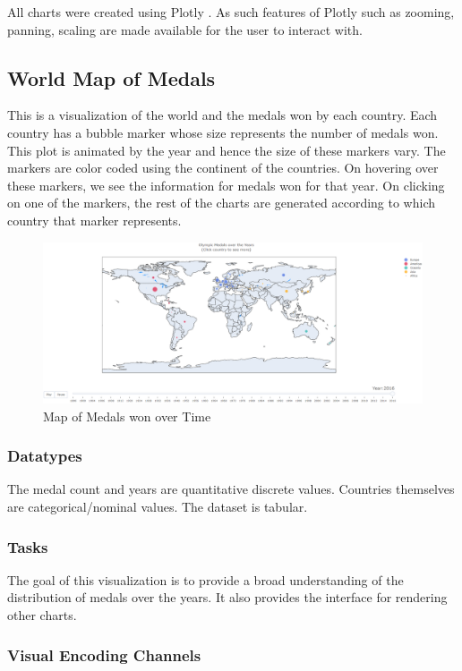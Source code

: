 \documentclass[a4paper, 10pt]{article}
\begin{document}
All charts were created using Plotly \cite{plotly}. As such features of Plotly such as zooming, panning, scaling are made available for the user to interact with.

\subsection{World Map of Medals}

This is a visualization of the world and the medals won by each country. Each country has a bubble marker whose size represents the number of medals won. This plot is animated by the year and hence the size of these markers vary. The markers are color coded using the continent of the countries. On hovering over these markers, we see the information for medals won for that year. On clicking on one of the markers, the rest of the charts are generated according to which country that marker represents.

\begin{figure}[b]
\centering
\includegraphics[scale=0.30]{map.png}
\caption{Map of Medals won over Time}
\end{figure}

\subsubsection{Datatypes}
The medal count and years are quantitative discrete values. Countries themselves are categorical/nominal values. The dataset is tabular.

\subsubsection{Tasks}
The goal of this visualization is to provide a broad understanding of the distribution of medals over the years. It also provides the interface for rendering other charts.

\subsubsection{Visual Encoding Channels}
\end{document}

